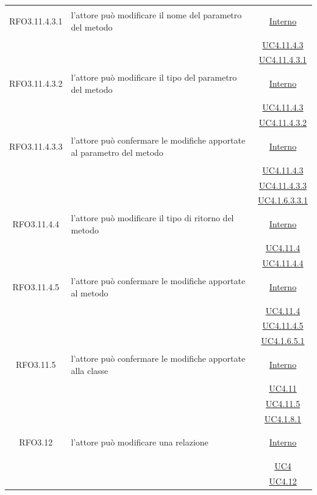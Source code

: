 \begin{longtable}{|c|>{\centering}m{7cm}|c|}
\hypertarget{RFO3.11.4.3.1}{RFO3.11.4.3.1} & l'attore può modificare il nome del parametro del metodo &  \hyperlink{Interno}{Interno}\\
& &\hyperref[UC4.11.4.3]{UC4.11.4.3}\\
& &\hyperref[UC4.11.4.3.1]{UC4.11.4.3.1}\\ \hline

\hypertarget{RFO3.11.4.3.2}{RFO3.11.4.3.2} & l'attore può modificare il tipo del parametro del metodo &  \hyperlink{Interno}{Interno}\\
& &\hyperref[UC4.11.4.3]{UC4.11.4.3}\\
& &\hyperref[UC4.11.4.3.2]{UC4.11.4.3.2}\\ \hline

\hypertarget{RFO3.11.4.3.3}{RFO3.11.4.3.3} & l'attore può confermare le modifiche apportate al parametro del metodo &  \hyperlink{Interno}{Interno}\\
& &\hyperref[UC4.11.4.3]{UC4.11.4.3}\\
& &\hyperref[UC4.11.4.3.3]{UC4.11.4.3.3}\\
& &\hyperref[UC4.1.6.3.3.1]{UC4.1.6.3.3.1}\\ \hline

\hypertarget{RFO3.11.4.4}{RFO3.11.4.4} & l'attore può modificare il tipo di ritorno del metodo &  \hyperlink{Interno}{Interno}\\
& &\hyperref[UC4.11.4]{UC4.11.4}\\
& &\hyperref[UC4.11.4.4]{UC4.11.4.4}\\ \hline

\hypertarget{RFO3.11.4.5}{RFO3.11.4.5} & l'attore può confermare le modifiche apportate al metodo &  \hyperlink{Interno}{Interno}\\
& &\hyperref[UC4.11.4]{UC4.11.4}\\
& &\hyperref[UC4.11.4.5]{UC4.11.4.5}\\
& &\hyperref[UC4.1.6.5.1]{UC4.1.6.5.1}\\ \hline

\hypertarget{RFO3.11.5}{RFO3.11.5} & l'attore può confermare le modifiche apportate alla classe &  \hyperlink{Interno}{Interno}\\
& &\hyperref[UC4.11]{UC4.11}\\
& &\hyperref[UC4.11.5]{UC4.11.5}\\
& &\hyperref[UC4.1.8.1]{UC4.1.8.1}\\ \hline

\hypertarget{RFO3.12}{RFO3.12} & l'attore può modificare una relazione &  \hyperlink{Interno}{Interno}\\
& &\hyperref[UC4]{UC4}\\
& &\hyperref[UC4.12]{UC4.12}\\ \hline


\end{longtable}
